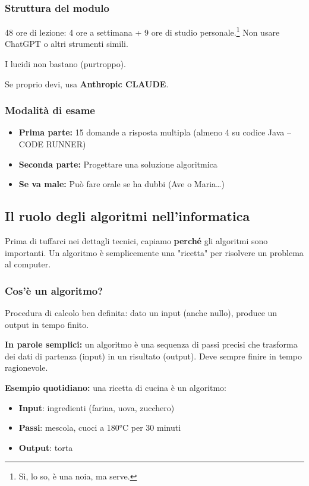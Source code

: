 \subsubsection{Struttura del modulo}
48 ore di lezione: 4 ore a settimana + 9 ore di studio personale.\footnote{Sì, lo so, è una noia, ma serve.}
Non usare ChatGPT o altri strumenti simili.

I lucidi non bastano (purtroppo).

Se proprio devi, usa \textbf{Anthropic CLAUDE}.

\subsubsection{Modalità di esame}
\begin{itemize}
	\item \textbf{Prima parte:} 15 domande a risposta multipla
	(almeno 4 su codice Java -- CODE RUNNER)
	\item \textbf{Seconda parte:} Progettare una soluzione algoritmica
	\item \textbf{Se va male:} Può fare orale se ha dubbi (Ave o Maria\dots)
\end{itemize}

\subsection{Il ruolo degli algoritmi nell'informatica}

\begin{softnote}
	Prima di tuffarci nei dettagli tecnici, capiamo \textbf{perché} gli algoritmi sono importanti. Un algoritmo è semplicemente una "ricetta" per risolvere un problema al computer.
\end{softnote}

\subsubsection{Cos'è un algoritmo?}

\begin{definizione}[Algoritmo]
	Procedura di calcolo ben definita: dato un input (anche nullo), produce un output
	in tempo finito.
\end{definizione}

\begin{nota}
	\textbf{In parole semplici:} un algoritmo è una sequenza di passi precisi che trasforma dei dati di partenza (input) in un risultato (output). Deve sempre finire in tempo ragionevole.
	
	\textbf{Esempio quotidiano:} una ricetta di cucina è un algoritmo:
	\begin{itemize}
		\item \textbf{Input}: ingredienti (farina, uova, zucchero)
		\item \textbf{Passi}: mescola, cuoci a 180°C per 30 minuti
		\item \textbf{Output}: torta
	\end{itemize}
\end{nota}

